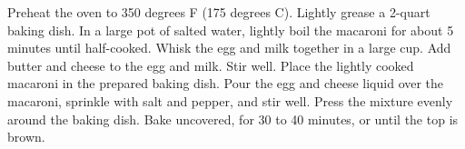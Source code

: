 \begin{recipe}

\begin{recipemeta}
\end{recipemeta}

\begin{recipetext}
Preheat the oven to 350 degrees F (175 degrees C). Lightly grease a 2-quart baking dish.
In a large pot of salted water, lightly boil the macaroni for about 5 minutes until half-cooked.
Whisk the egg and milk together in a large cup. Add butter and cheese to the egg and milk. Stir well.
Place the lightly cooked macaroni in the prepared baking dish. Pour the egg and cheese liquid over the macaroni, sprinkle with salt and pepper, and stir well. Press the mixture evenly around the baking dish.
Bake uncovered, for 30 to 40 minutes, or until the top is brown.
\end{recipetext}

\end{recipe}
